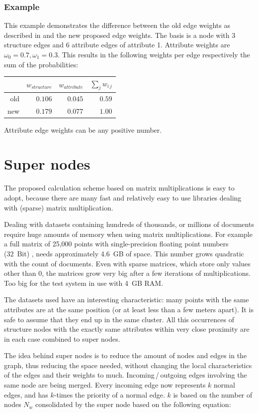 \subsubsection*{Example}
This example demonstrates the difference between the old edge weights as described in \cite{Zhou2009} and the new proposed edge weights. The basis is a node with 3 structure edges and 6 attribute edges of attribute 1. Attribute weights are $\omega_0 = 0.7, \omega_1 = 0.3$. This results in the following weights per edge respectively the sum of the probabilities:


\begin{center}
\footnotesize
\begin{tabular}{rrrr}
\toprule
 & $w_{structure}$ & $w_{attribute}$ & $\sum_{j} w_{i\,j}$\\
\midrule
old & $0.106$ & $0.045$ & $0.59$\\
new & $0.179$ & $0.077$ & $1.00$\\
\bottomrule
\end{tabular}
\end{center}
%
Attribute edge weights can be any positive number.

\section{Super nodes}
The proposed calculation scheme based on matrix multiplications is easy to adopt, because there are many fast and relatively easy to use libraries dealing with (sparse) matrix multiplication.

Dealing with datasets containing hundreds of thousands, or millions of documents require huge amounts of memory when using matrix multiplications. 
For example a full matrix of 25,000 points with single-precision floating point numbers (32~Bit) , needs approximately 4.6~GB of space. This number grows quadratic with the count of documents. Even with sparse matrices, which store only values other than $0$, the matrices grow very big after a few iterations of multiplications. Too big for the test system in use with 4~GB RAM.

The datasets used have an interesting characteristic: many points with the same attributes are at the same position (or at least less than a few meters apart). It is safe to assume that they end up in the same cluster. All this occurrences of structure nodes with the exactly same attributes within very close proximity are in each case combined to super nodes.

The idea behind super nodes is to reduce the amount of nodes and edges in the graph, thus reducing the space needed, without changing the local characteristics of the edges and their weights to much. Incoming\,/\,outgoing edges involving the same node are being merged. Every incoming edge now represents $k$ normal edges, and has $k$-times the priority of a normal edge. $k$ is based on the number of nodes $N_w$ consolidated by the super node based on the following equation:

